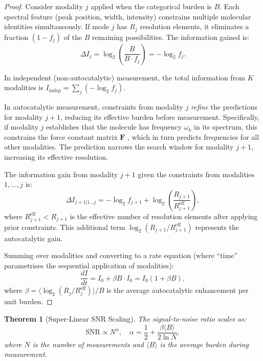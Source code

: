\documentclass[11pt,a4paper]{article}
\newtheorem{theorem}{Theorem}[section]
\theoremstyle{definition}
\theoremstyle{remark}
\begin{document}
\begin{proof}
Consider modality $j$ applied when the categorical burden is $B$. Each spectral feature (peak position, width, intensity) constrains multiple molecular identities simultaneously. If mode $j$ has $R_j$ resolution elements, it eliminates a fraction $(1 - f_j)$ of the $B$ remaining possibilities. The information gained is:
\begin{equation}
\Delta I_j = \log_2\left(\frac{B}{B \cdot f_j}\right) = -\log_2 f_j.
\end{equation}

In independent (non-autocatalytic) measurement, the total information from $K$ modalities is $I_{\mathrm{indep}} = \sum_j (-\log_2 f_j)$.

In autocatalytic measurement, constraints from modality $j$ \emph{refine} the predictions for modality $j+1$, reducing its effective burden before measurement. Specifically, if modality $j$ establishes that the molecule has frequency $\omega_k$ in its spectrum, this constrains the force constant matrix $\mathbf{F}$ \citep{wilson1955}, which in turn predicts frequencies for all other modalities. The prediction narrows the search window for modality $j+1$, increasing its effective resolution.

The information gain from modality $j+1$ given the constraints from modalities $1, \ldots, j$ is:
\begin{equation}
\Delta I_{j+1 | 1\ldots j} = -\log_2 f_{j+1} + \log_2\left(\frac{R_{j+1}}{R_{j+1}^{\mathrm{eff}}}\right),
\end{equation}
where $R_{j+1}^{\mathrm{eff}} < R_{j+1}$ is the effective number of resolution elements after applying prior constraints. This additional term $\log_2(R_{j+1}/R_{j+1}^{\mathrm{eff}})$ represents the autocatalytic gain.

Summing over modalities and converting to a rate equation (where ``time'' parametrises the sequential application of modalities):
\begin{equation}
\frac{dI}{dt} = I_0 + \beta B \cdot I_0 = I_0(1 + \beta B),
\end{equation}
where $\beta = \langle \log_2(R_j/R_j^{\mathrm{eff}}) \rangle / B$ is the average autocatalytic enhancement per unit burden.
\end{proof}

\begin{theorem}[Super-Linear SNR Scaling]
\label{thm:snr}
The signal-to-noise ratio scales as:
\begin{equation}
\mathrm{SNR} \propto N^{\alpha}, \quad \alpha = \frac{1}{2} + \frac{\beta \langle B \rangle}{2 \ln N},
\end{equation}
where $N$ is the number of measurements and $\langle B \rangle$ is the average burden during measurement.
\end{theorem}
\end{document}
